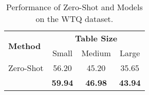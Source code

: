 \begin{table}[t]
\small
\centering
\begin{tabular}{lccc} 
\hline
\multirow{2}{*}{\textbf{Method}} & \multicolumn{3}{c}{\textbf{Table Size}} \\ \cline{2-4}
& Small & Medium  & Large  \\ \hline
Zero-Shot & 56.20 & 45.20 & 35.65 \\ \hline
\method{} & \textbf{59.94} & \textbf{46.98} & \textbf{43.94} \\ \hline
\end{tabular}
\caption{Performance of Zero-Shot and \method{} Models on the WTQ dataset.}
\label{tab:performance_different_table_size}
\end{table}
